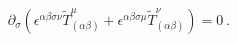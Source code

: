 \begin{equation}
\partial _{\sigma }\left( \epsilon ^{\alpha \beta \sigma \nu }\tilde{T}%
_{(\alpha \beta )}^{\mu }+\epsilon ^{\alpha \beta \sigma \mu }\tilde{T}%
_{(\alpha \beta )}^{\nu }\right) =0\ .  \label{const}
\end{equation}%
